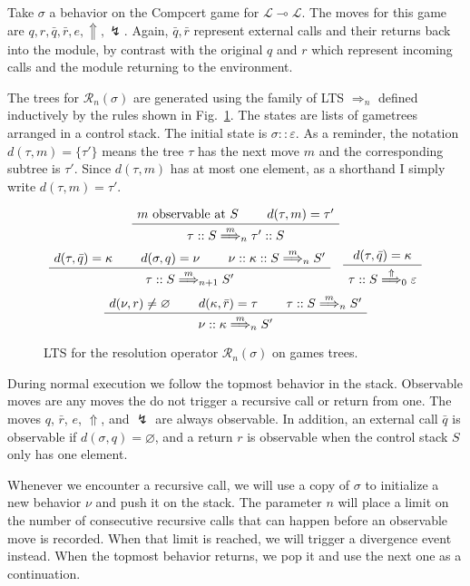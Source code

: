 \documentclass[11pt]{article}
\begin{document}
Take $\sigma$ a behavior on the Compcert game for
$\mathcal{L} \multimap \mathcal{L}$.
The moves for this game are $q, r, \bar{q}, \bar{r}, e, \Uparrow, \lightning$.
Again, $\bar{q}, \bar{r}$ represent external calls and their returns
back into the module,
by contrast with the original $q$ and $r$ which represent
incoming calls and the module returning to the environment.

The trees for $\mathcal{R}_n(\sigma)$ are generated
using the family of LTS $\Rightarrow_n$ defined inductively
by the rules shown in Fig.~\ref{fig:res}.
The states are lists of gametrees arranged in a control stack.
The initial state is $\sigma :: \varepsilon$.
As a reminder,
the notation $d(\tau, m) = \{\tau'\}$ means
the tree $\tau$ has the next move $m$
and the corresponding subtree is $\tau'$.
Since $d(\tau, m)$ has at most one element,
as a shorthand I simply write $d(\tau, m) = \tau'$.

\begin{figure}
\[
  \AxiomC{$m \mbox{ observable at } S$}
  \AxiomC{$d(\tau, m) = \tau'$}
  \BinaryInfC{$\tau :: S \stackrel{m}{\Longrightarrow}_n \tau' :: S$}
  \DisplayProof
\]
\[
  \AxiomC{$d(\tau, \bar{q}) = \kappa$}
  \AxiomC{$d(\sigma, q) = \nu$}
  \AxiomC{$\nu :: \kappa :: S \stackrel{m}{\Longrightarrow}_n S'$}
  \TrinaryInfC{$\tau :: S \stackrel{m}{\Longrightarrow}_{n+1} S'$}
  \DisplayProof
  \quad
  \AxiomC{$d(\tau, \bar{q}) = \kappa$}
  \UnaryInfC{$\tau :: S \stackrel{\Uparrow}{\Longrightarrow}_0 \varepsilon$}
  \DisplayProof
\]
\vspace{.5em}
\[
  \AxiomC{$d(\nu, r) \ne \varnothing$}
  \AxiomC{$d(\kappa, \bar{r}) = \tau$}
  \AxiomC{$\tau :: S \stackrel{m}{\Longrightarrow}_n S'$}
  \TrinaryInfC{$\nu :: \kappa \stackrel{m}{\Longrightarrow}_n S'$}
  \DisplayProof
\]
\caption{LTS for the resolution operator
  $\mathcal{R}_n(\sigma)$ on games trees.}
\label{fig:res}
\end{figure}

During normal execution we follow the topmost behavior in the stack.
Observable moves are any moves the do not trigger a recursive call
or return from one.
The moves $q$, $\bar{r}$, $e$, $\Uparrow$, and $\lightning$
are always observable.
In addition,
an external call $\bar{q}$
is observable if $d(\sigma, q) = \varnothing$,
and a return $r$
is observable when the control stack $S$ only has one element.

Whenever we encounter a recursive call,
we will use a copy of $\sigma$
to initialize a new behavior $\nu$ and push it on the stack.
The parameter $n$ will place a limit on
the number of consecutive recursive calls that can happen
before an observable move is recorded.
When that limit is reached,
we will trigger a divergence event instead.
When the topmost behavior returns,
we pop it and use the next one as a continuation.
\end{document}
